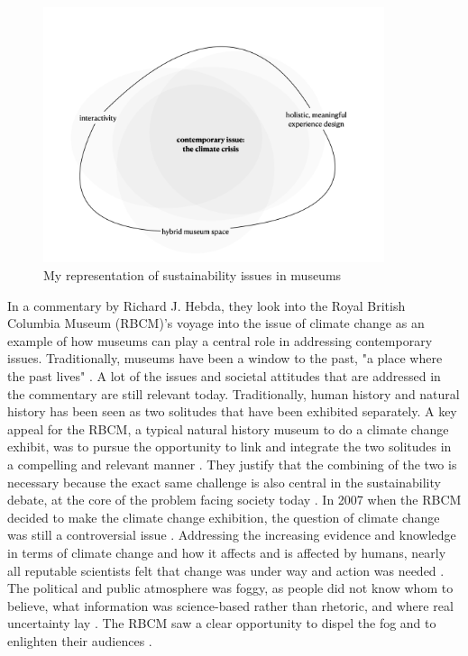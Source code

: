 \begin{figure}[h]
\includegraphics[width=10cm]{pictures/problem_sphere.png}
\caption{My representation of sustainability issues in museums}
\centering
\end{figure}


In a commentary by Richard J. Hebda, they look into the Royal British Columbia Museum (RBCM)’s voyage into the issue of climate change as an example of how museums can play a central role in addressing contemporary issues. Traditionally, museums have been a window to the past, "a place where the past lives" \autocite[p. 1]{hebda_article}. A lot of the issues and societal attitudes that are addressed in the commentary are still relevant today. Traditionally, human history and natural history has been seen as two solitudes that have been exhibited separately. A key appeal for the RBCM, a typical natural history museum to do a climate change exhibit, was to pursue the opportunity to link and integrate the two solitudes in a compelling and relevant manner \autocite[p. 2]{hebda_article}. They justify that the combining of the two is necessary because the exact same challenge is also central in the sustainability debate, at the core of the problem facing society today \autocite[p.2]{hebda_article}. In 2007 when the RBCM decided to make the climate change exhibition, the question of climate change was still a controversial issue \autocite[p.2]{hebda_article}. Addressing the increasing evidence and knowledge in terms of climate change and how it affects and is affected by humans, nearly all reputable scientists felt that change was under way and action was needed \autocite[p.2]{hebda_article}. The political and public atmosphere was foggy, as people did not know whom to believe, what information was science-based rather than rhetoric, and where real uncertainty lay \autocite[p.2]{hebda_article}. The RBCM saw a clear opportunity to dispel the fog and to enlighten their audiences \autocite[p.2]{hebda_article}.


